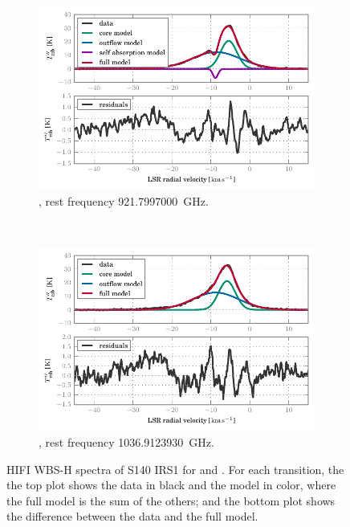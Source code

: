\begin{figure}
    \centering
    \begin{subfigure}[b]{\textwidth}
        \includegraphics{87_00_00_corrected}
        \vspace{-.8em}
        \caption{, rest frequency \SI{ 921.7997000}{\giga\hertz}.}
    \end{subfigure}
    \\
    \bigskip
    \begin{subfigure}[b]{\textwidth}
        \includegraphics{98_00_00_corrected}
        \vspace{-.8em}
        \caption{, rest frequency \SI{1036.9123930}{\giga\hertz}.}
    \end{subfigure}
    \caption{
        HIFI WBS-H spectra of S140 IRS1 for  and .
        For each transition, the the top plot shows the data in black and the model in color, where the full model is the sum of the others; and the bottom plot shows the difference between the data and the full model.
    }
    \label{fig:spectra_transitions}
\end{figure}

